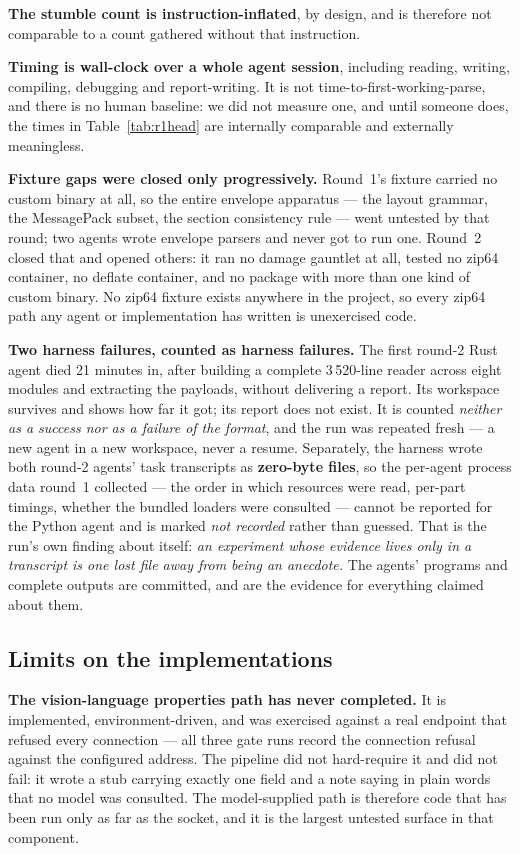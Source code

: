 \documentclass[10pt,twocolumn,letterpaper]{article}
\begin{document}
\textbf{The stumble count is instruction-inflated}, by design, and is therefore
not comparable to a count gathered without that instruction.

\textbf{Timing is wall-clock over a whole agent session}, including reading,
writing, compiling, debugging and report-writing. It is not
time-to-first-working-parse, and there is no human baseline: we did not measure
one, and until someone does, the times in Table~\ref{tab:r1head} are internally
comparable and externally meaningless.

\textbf{Fixture gaps were closed only progressively.} Round~1's fixture carried no
custom binary at all, so the entire envelope apparatus --- the layout grammar, the
MessagePack subset, the section consistency rule --- went untested by that round;
two agents wrote envelope parsers and never got to run one. Round~2 closed that
and opened others: it ran no damage gauntlet at all, tested no zip64 container, no
deflate container, and no package with more than one kind of custom binary. No
zip64 fixture exists anywhere in the project, so every zip64 path any agent or
implementation has written is unexercised code.

\textbf{Two harness failures, counted as harness failures.} The first round-2 Rust
agent died 21 minutes in, after building a complete 3\,520-line reader across eight
modules and extracting the payloads, without delivering a report. Its workspace
survives and shows how far it got; its report does not exist. It is counted
\emph{neither as a success nor as a failure of the format}, and the run was
repeated fresh --- a new agent in a new workspace, never a resume. Separately, the
harness wrote both round-2 agents' task transcripts as \textbf{zero-byte files}, so
the per-agent process data round~1 collected --- the order in which resources were
read, per-part timings, whether the bundled loaders were consulted --- cannot be
reported for the Python agent and is marked \emph{not recorded} rather than
guessed. That is the run's own finding about itself: \emph{an experiment whose
evidence lives only in a transcript is one lost file away from being an anecdote.}
The agents' programs and complete outputs are committed, and are the evidence for
everything claimed about them.

\subsection{Limits on the implementations}

\textbf{The vision-language properties path has never completed.} It is
implemented, environment-driven, and was exercised against a real endpoint that
refused every connection --- all three gate runs record the connection refusal
against the configured address. The pipeline did not hard-require it and did not
fail: it wrote a stub carrying exactly one field and a note saying in plain words
that no model was consulted. The model-supplied path is therefore code that has
been run only as far as the socket, and it is the largest untested surface in that
component.
\end{document}
